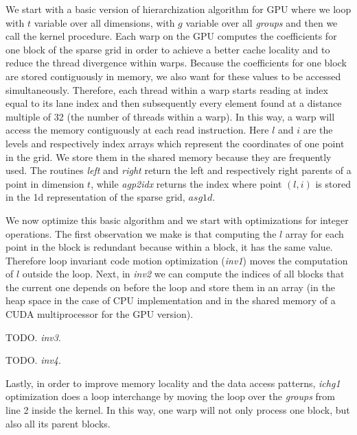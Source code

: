 We start with a basic version of hierarchization algorithm for GPU where we loop
with $t$ variable over all dimensions, with $g$ variable over all \textit{groups}
and then we call the kernel procedure. Each warp on the GPU computes the
coefficients for one block of the sparse grid in order to achieve a better cache
locality and to reduce the thread divergence within warps. Because the
coefficients for one block are stored contiguously in memory, we also want for
these values to be accessed simultaneously. Therefore, each thread within a warp
starts reading at index equal to its lane index and then subsequently every
element found at a distance multiple of 32 (the number of threads within a
warp). In this way, a warp will access the memory contiguously at each read
instruction. Here $l$ and $i$ are the levels and respectively index arrays
which represent the coordinates of one point in the grid. We store them in the
shared memory because they are frequently used. The routines \textit{left} and
\textit{right} return the left and respectively right parents of a point in
dimension $t$, while \textit{agp2idx} returns the index where point $(l, i)$ is
stored in the 1d representation of the sparse grid, $asg1d$.

We now optimize this basic algorithm and we start with optimizations for integer
operations. The first observation we make is that computing the $l$ array for
each point in the block is redundant because within a block, it has the same
value. Therefore loop invariant code motion optimization (\textit{inv1}) moves
the computation of $l$ outside the loop. Next, in \textit{inv2} we can compute
the indices of all blocks that the current one depends on before the loop and
store them in an array (in the heap space in the case of CPU implementation and
in the shared memory of a CUDA multiprocessor for the GPU version).

TODO. \textit{inv3}.

TODO. \textit{inv4}.

Lastly, in order to improve memory locality and the data access patterns,
\textit{ichg1} optimization does a loop interchange by moving the loop over the
\textit{groups} from line 2 inside the kernel. In this way, one warp will not
only process one block, but also all its parent blocks.


